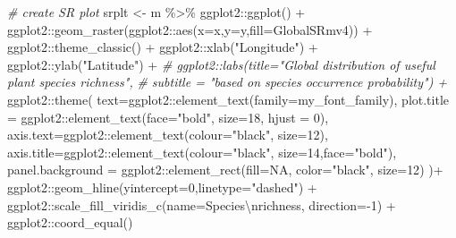 \documentclass[
]{article}
\newenvironment{Shaded}{\begin{snugshade}}{\end{snugshade}}
\newcommand{\AttributeTok}[1]{\textcolor[rgb]{0.77,0.63,0.00}{#1}}
\newcommand{\CommentTok}[1]{\textcolor[rgb]{0.56,0.35,0.01}{\textit{#1}}}
\newcommand{\ConstantTok}[1]{\textcolor[rgb]{0.00,0.00,0.00}{#1}}
\newcommand{\DecValTok}[1]{\textcolor[rgb]{0.00,0.00,0.81}{#1}}
\newcommand{\FunctionTok}[1]{\textcolor[rgb]{0.00,0.00,0.00}{#1}}
\newcommand{\NormalTok}[1]{#1}
\newcommand{\OtherTok}[1]{\textcolor[rgb]{0.56,0.35,0.01}{#1}}
\newcommand{\SpecialCharTok}[1]{\textcolor[rgb]{0.00,0.00,0.00}{#1}}
\newcommand{\StringTok}[1]{\textcolor[rgb]{0.31,0.60,0.02}{#1}}
\begin{document}
\begin{Shaded}
\begin{Highlighting}[]
\CommentTok{\# create SR plot}
\NormalTok{srplt }\OtherTok{\textless{}{-}}\NormalTok{ m }\SpecialCharTok{\%\textgreater{}\%}
\NormalTok{  ggplot2}\SpecialCharTok{::}\FunctionTok{ggplot}\NormalTok{() }\SpecialCharTok{+}
\NormalTok{  ggplot2}\SpecialCharTok{::}\FunctionTok{geom\_raster}\NormalTok{(ggplot2}\SpecialCharTok{::}\FunctionTok{aes}\NormalTok{(}\AttributeTok{x=}\NormalTok{x,}\AttributeTok{y=}\NormalTok{y,}\AttributeTok{fill=}\NormalTok{GlobalSRmv4)) }\SpecialCharTok{+}
\NormalTok{  ggplot2}\SpecialCharTok{::}\FunctionTok{theme\_classic}\NormalTok{() }\SpecialCharTok{+}
\NormalTok{  ggplot2}\SpecialCharTok{::}\FunctionTok{xlab}\NormalTok{(}\StringTok{"Longitude"}\NormalTok{) }\SpecialCharTok{+}\NormalTok{ ggplot2}\SpecialCharTok{::}\FunctionTok{ylab}\NormalTok{(}\StringTok{"Latitude"}\NormalTok{) }\SpecialCharTok{+}
  \CommentTok{\# ggplot2::labs(title="Global distribution of useful plant species richness",}
  \CommentTok{\#               subtitle = "based on species occurrence probability") +}
\NormalTok{  ggplot2}\SpecialCharTok{::}\FunctionTok{theme}\NormalTok{(}
    \AttributeTok{text=}\NormalTok{ggplot2}\SpecialCharTok{::}\FunctionTok{element\_text}\NormalTok{(}\AttributeTok{family=}\NormalTok{my\_font\_family),}
    \AttributeTok{plot.title =}\NormalTok{ ggplot2}\SpecialCharTok{::}\FunctionTok{element\_text}\NormalTok{(}\AttributeTok{face=}\StringTok{"bold"}\NormalTok{, }\AttributeTok{size=}\DecValTok{18}\NormalTok{, }\AttributeTok{hjust =} \DecValTok{0}\NormalTok{),}
    \AttributeTok{axis.text=}\NormalTok{ggplot2}\SpecialCharTok{::}\FunctionTok{element\_text}\NormalTok{(}\AttributeTok{colour=}\StringTok{"black"}\NormalTok{, }\AttributeTok{size=}\DecValTok{12}\NormalTok{),}
    \AttributeTok{axis.title=}\NormalTok{ggplot2}\SpecialCharTok{::}\FunctionTok{element\_text}\NormalTok{(}\AttributeTok{colour=}\StringTok{"black"}\NormalTok{, }\AttributeTok{size=}\DecValTok{14}\NormalTok{,}\AttributeTok{face=}\StringTok{"bold"}\NormalTok{),}
    \AttributeTok{panel.background =}\NormalTok{ ggplot2}\SpecialCharTok{::}\FunctionTok{element\_rect}\NormalTok{(}\AttributeTok{fill=}\ConstantTok{NA}\NormalTok{, }\AttributeTok{color=}\StringTok{"black"}\NormalTok{, }\AttributeTok{size=}\DecValTok{12}\NormalTok{)}
\NormalTok{  )}\SpecialCharTok{+}
\NormalTok{  ggplot2}\SpecialCharTok{::}\FunctionTok{geom\_hline}\NormalTok{(}\AttributeTok{yintercept=}\DecValTok{0}\NormalTok{,}\AttributeTok{linetype=}\StringTok{"dashed"}\NormalTok{) }\SpecialCharTok{+} 
\NormalTok{  ggplot2}\SpecialCharTok{::}\FunctionTok{scale\_fill\_viridis\_c}\NormalTok{(}\AttributeTok{name=}\StringTok{\textquotesingle{}Species}\SpecialCharTok{\textbackslash{}n}\StringTok{richness\textquotesingle{}}\NormalTok{, }\AttributeTok{direction=}\SpecialCharTok{{-}}\DecValTok{1}\NormalTok{) }\SpecialCharTok{+}
\NormalTok{  ggplot2}\SpecialCharTok{::}\FunctionTok{coord\_equal}\NormalTok{()}


\end{Highlighting}
\end{Shaded}
\end{document}
